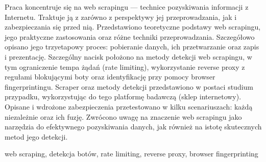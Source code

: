 \streszczenie
Praca koncentruje się na web scrapingu --- technice pozyskiwania informacji z Internetu.
Traktuje ją z zarówno z perspektywy jej przeprowadzania, jak i zabezpieczania się przed nią.
Przedstawiono teoretyczne podstawy web scrapingu, jego praktyczne zastosowania oraz różne techniki przeprowadzania.
Szczegółowo opisano jego trzyetapowy proces: pobieranie danych, ich przetwarzanie oraz zapis i prezentację.
Szczególny nacisk położono na metody detekcji web scrapingu, w tym ograniczenie tempa żądań (rate limiting),
wykorzystanie reverse proxy z regułami blokującymi boty oraz identyfikację przy pomocy browser fingerprintingu.
Scraper oraz metody detekcji przedstawiono w postaci studium przypadku, wykorzystując do tego platformę badawczą (sklep internetowy).
Opisane i wdrożone zabezpieczenia przetestowano w kilku scenariuszach: każdą niezależnie oraz ich fuzję.
Zwrócono uwagę na znaczenie web scrapingu jako narzędzia do efektywnego pozyskiwania danych, jak również na istotę skutecznych metod jego detekcji.

\slowakluczowe web scraping, detekcja botów, rate limiting, reverse proxy, browser fingerprinting